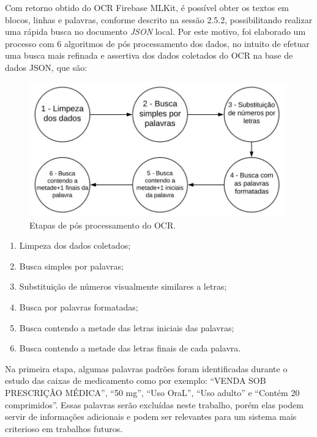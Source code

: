 Com retorno obtido do OCR Firebase MLKit, é possível obter os textos em blocos, linhas e palavras, conforme descrito na sessão 2.5.2, possibilitando realizar uma rápida busca no documento \textit{JSON} local. Por este motivo, foi elaborado um processo com 6 algoritmos de pós processamento dos dados, no intuito de efetuar uma busca mais refinada e assertiva dos dados coletados do OCR na base de dados JSON, que são:
 \begin{figure}[h!]
	\centering
	\includegraphics[width=0.99\textwidth]{Imagens/steps.JPG} 
	\caption[Etapas de pós processamento do OCR.]{Etapas de pós processamento do OCR.}
	\label{app}
\end{figure}
\begin{enumerate}
  \item Limpeza dos dados coletados;
  \item Busca simples por palavras;
  \item Substituição de números visualmente similares a letras;
  \item Busca por palavras formatadas;
  \item Busca contendo a metade das letras iniciais das palavras;
  \item Busca contendo a metade das letras finais de cada palavra.
\end{enumerate}

Na primeira etapa, algumas palavras padrões foram identificadas durante o estudo das caixas de medicamento como por exemplo: ``VENDA SOB PRESCRIÇÃO MÉDICA'', ``50 mg'', ``Uso OraL'', ``Uso adulto'' e ``Contém 20 comprimidos''. Essas palavras serão excluídas neste trabalho, porém elas podem servir de informações adicionais e podem ser relevantes para um sistema mais criterioso em trabalhos futuros.

